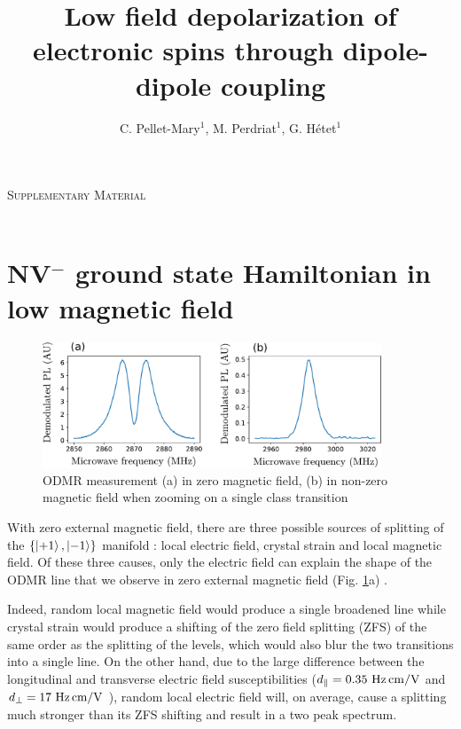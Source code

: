 \documentclass[preprintnumbers,amsmath,amssymb,onecolumn,12pt]{revtex4-2}
\begin{document}
\vspace{0.2in}
{\Large \hspace{1.6in}\textsc{Supplementary Material} }\\
\
\title{Low field depolarization of electronic spins through dipole-dipole coupling}

\author{C. Pellet-Mary$^1$, M. Perdriat$^1$, G. H\'etet$^1$} 


\maketitle

\tableofcontents

\section{NV$^-$ ground state Hamiltonian in low magnetic field}
\label{sec Hamiltonian}
\begin{figure}
\includegraphics[width=0.9\textwidth]{Figures_SI/fig_ESR}
\caption{ODMR measurement (a) in zero magnetic field, (b) in non-zero magnetic field when zooming on a single class transition}
\label{ESR_single_spin}
\end{figure}
With zero external magnetic field, there are three possible sources of splitting of the $\{\ket{+1},\ket{-1}\}$ manifold : local electric field, crystal strain and local magnetic field. Of these three causes, only the electric field can explain the shape of the ODMR line that we observe in zero external magnetic field (Fig. \ref{ESR_single_spin}a) \cite{mittiga2018imaging}.

Indeed, random local magnetic field would produce a single broadened line while crystal strain would produce a shifting of the zero field splitting (ZFS) of the same order as the splitting of the levels, which would also blur the two transitions into a single line. On the other hand, due to the large difference between the longitudinal and transverse electric field susceptibilities ($d_\parallel = 0.35\ \rm Hz\, cm/V$ and $d_\perp = 17\ \rm Hz\, cm/V$ \cite{van1990electric}), random local electric field will, on average, cause a splitting much stronger than its ZFS shifting and result in a two peak spectrum.
\end{document}
